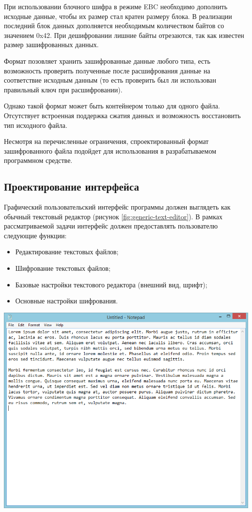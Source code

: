 При использовании блочного шифра в режиме EBC необходимо дополнить исходные
данные, чтобы их размер стал кратен размеру блока. В реализации последний
блок данных дополняется необходимым количеством байтов со значением 0x42.
При дешифровании лишние байты отрезаются, так как известен размер
зашифрованных данных.

Формат позовляет хранить зашифрованные данные любого типа,
есть возможность проверить полученные после расшифрования данные
на соответствие исходным данным (то есть проверить был ли использован
правильный ключ при расшифровании).

Однако такой формат может быть контейнером только для одного файла.
Отсутствует встроенная поддержка сжатия данных и возможность восстановить
тип исходного файла.

Несмотря на перечисленные ограничения, спроектированный формат зашифрованного файла
подойдет для использования в разрабатываемом программном средстве.

\subsection{Проектирование интерфейса}

Графический пользовательский интерфейс программы должен выглядеть
как обычный текстовый редактор (рисунок \ref{fig:generic-text-editor}).
В рамках рассматриваемой задачи интерфейс должен предоставлять
пользователю следующие функции:
\begin{itemize}
    \item Редактирование текстовых файлов;
    \item Шифрование текстовых файлов;
    \item Базовые настройки текстового редактора (внешний вид, шрифт);
    \item Основные настройки шифрования.
\end{itemize}

\noindent
\begin{minipage}{\linewidth}
  \centering
  \vspace{3.5mm}
  \includegraphics[scale=0.6]{./pics/generic-text-editor.png}
  \label{fig:generic-text-editor}
  \vspace{3.5mm}
\end{minipage}
